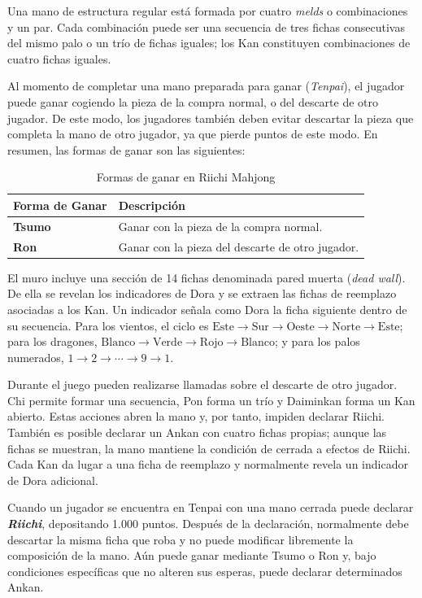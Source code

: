 Una mano de estructura regular está formada por cuatro \label{txt:melds}\textit{melds} o combinaciones y un par. Cada combinación puede ser una secuencia de tres fichas consecutivas del mismo palo o un trío de fichas iguales; los Kan constituyen combinaciones de cuatro fichas iguales.

Al momento de completar una mano preparada para ganar (\textit{Tenpai}), el jugador puede ganar cogiendo la pieza de la compra normal, o del descarte de otro jugador. De este modo, los jugadores también deben evitar descartar la pieza que completa la mano de otro jugador, ya que pierde puntos de este modo. En resumen, las formas de ganar son las siguientes:

\begin{table}[H]
\centering
\begin{tabular}{|l|l|}
\hline
\textbf{Forma de Ganar} & \textbf{Descripción} \\
\hline
\textbf{Tsumo} & Ganar con la pieza de la compra normal. \\
\textbf{Ron} & Ganar con la pieza del descarte de otro jugador. \\
\hline
\end{tabular}
\caption{
Formas de ganar en Riichi Mahjong
}
\label{tab:winning-conditions}
\end{table}

El muro incluye una sección de 14 fichas denominada pared muerta (\textit{dead wall}). De ella se revelan los indicadores de Dora y se extraen las fichas de reemplazo asociadas a los Kan. Un indicador señala como Dora la ficha siguiente dentro de su secuencia. Para los vientos, el ciclo es $\text{Este} \rightarrow \text{Sur} \rightarrow \text{Oeste} \rightarrow \text{Norte} \rightarrow \text{Este}$; para los dragones, $\text{Blanco} \rightarrow \text{Verde} \rightarrow \text{Rojo} \rightarrow \text{Blanco}$; y para los palos numerados, $1 \rightarrow 2 \rightarrow \cdots \rightarrow 9 \rightarrow 1$.

Durante el juego pueden realizarse llamadas sobre el descarte de otro jugador. Chi permite formar una secuencia, Pon forma un trío y Daiminkan forma un Kan abierto. Estas acciones abren la mano y, por tanto, impiden declarar Riichi. También es posible declarar un Ankan con cuatro fichas propias; aunque las fichas se muestran, la mano mantiene la condición de cerrada a efectos de Riichi. Cada Kan da lugar a una ficha de reemplazo y normalmente revela un indicador de Dora adicional.

Cuando un jugador se encuentra en Tenpai con una mano cerrada puede declarar \textbf{\textit{Riichi}}, depositando 1.000 puntos. Después de la declaración, normalmente debe descartar la misma ficha que roba y no puede modificar libremente la composición de la mano. Aún puede ganar mediante Tsumo o Ron y, bajo condiciones específicas que no alteren sus esperas, puede declarar determinados Ankan.


